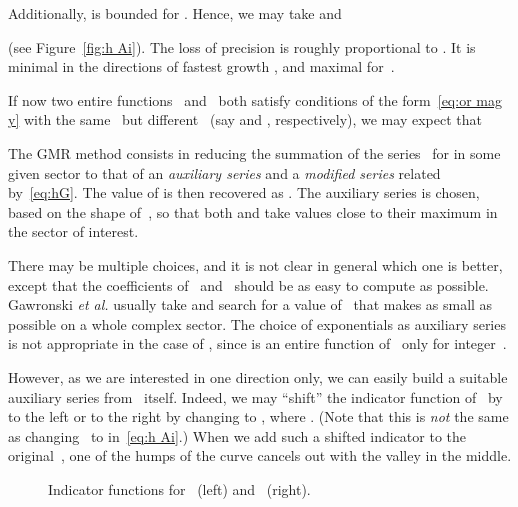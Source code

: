 \documentclass[10pt, conference]{IEEEtran}
\begin{document}
Additionally,  is bounded for . Hence, we
may take  and

(see Figure~\ref{fig:h Ai}). The loss of precision is roughly proportional to
. It is minimal in the directions of fastest
growth , and maximal for~.

If now two entire functions ~and~ both satisfy conditions of the
form~\eqref{eq:or mag y} with the same~ but different~ (say  and
, respectively), we may expect that

The GMR method consists in reducing the summation of the series~ for  in
some given sector to that of an {\emph{auxiliary series}} 
and a {\emph{modified series}}  related by~\eqref{eq:hG}.
The value of  is then recovered as . The auxiliary series is chosen, based on the shape
of~, so that both  and  take values close to their
maximum in the sector of interest.



There may be multiple choices, and it is not clear in general which one is better, except that the coefficients of ~and~ should be as easy to compute as possible.
Gawronski {\emph{et al.}} usually take  and search for a value of~ that makes  as small as possible on a whole complex sector. The choice of
exponentials as auxiliary series is not appropriate in the case of
, since  is an entire function of~
only for integer~.


However, as we are interested in one direction only, we can easily build a
suitable auxiliary series from~ itself. Indeed, we may ``shift''
the indicator function of~ by  to the left or to the
right by changing  to , where . (Note
that this is {\emph{not}} the same as changing~ to  in~\eqref{eq:h Ai}.) When we add such a shifted
indicator to the original~, one of the humps of the curve cancels out with
the valley in the middle.

\begin{figure}
  \hfill
  \caption{Indicator functions for~ (left) and~ (right).\label{fig:h F G}}
\end{figure}
\end{document}
